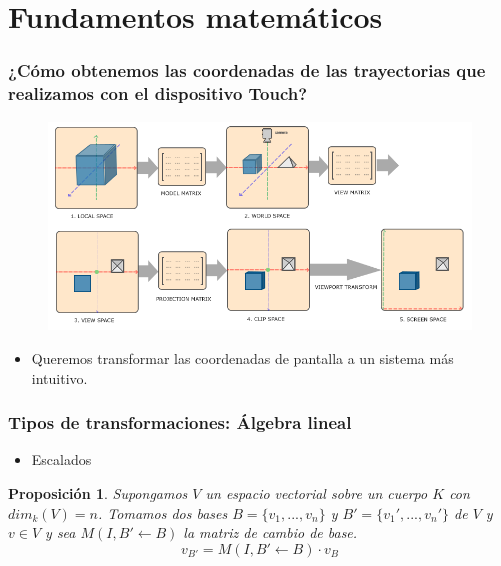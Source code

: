 \documentclass[pdf]{beamer}
\newtheorem{prop}{Proposición}
\begin{document}
\section{Fundamentos matemáticos}
\begin{frame}
	\frametitle{¿Cómo obtenemos las coordenadas de las trayectorias que realizamos con el dispositivo Touch?}

		\begin{figure}
		\centering
		\includegraphics[width=\textwidth]{coordinate_systems}
	\end{figure}
\begin{itemize}
	\fontsize{10pt}{9pt}\selectfont
	\item Queremos transformar las coordenadas de pantalla a un sistema más intuitivo.
\end{itemize}
\end{frame}
\begin{frame}
	\frametitle{Tipos de transformaciones: Álgebra lineal}
	
	\begin{itemize}
		
		\item Escalados
		
	\end{itemize}

\begin{prop}
	\label{prop:cambio_base}
	Supongamos $V$ un espacio vectorial sobre un cuerpo $K$ con $dim_k(V) = n$. Tomamos dos bases $B = \{v_1,...,v_n\}$ y $B' = \{v_1',...,v_n'\}$ de $V$ y $ v \in V$ y sea $M(I, B' \leftarrow B)$ la matriz de cambio de base.
	\begin{equation}
		v_{B'} = M(I, B' \leftarrow B)\cdot  v_B
	\end{equation}
\end{prop}
\end{frame}
\end{document}

